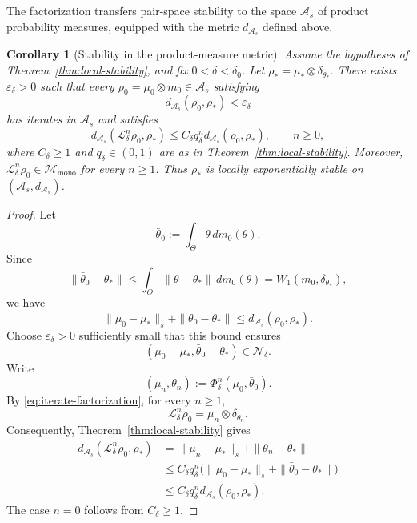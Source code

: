 \documentclass[11pt]{article}
\newtheorem{corollary}[theorem]{Corollary}
\theoremstyle{definition}
\theoremstyle{remark}
\newcommand{\STO}{\mathcal{L}}
\newcommand{\Mmono}{\mathscr{M}_{\mathrm{mono}}}
\begin{document}
{

The factorization transfers pair-space stability to the
space $\mathcal A_s$ of product probability measures,
equipped with the metric $d_{\mathcal A_s}$ defined above.

\begin{corollary}[Stability in the product-measure metric]
\label{cor:ambient-metric-stability}
Assume the hypotheses of
Theorem~\ref{thm:local-stability}, and fix
$0<\delta<\delta_0$.
Let $\rho_*=\mu_*\otimes\delta_{\theta_*}$.
There exists $\varepsilon_\delta>0$ such that every
$\rho_0=\mu_0\otimes m_0\in\mathcal A_s$ satisfying
\[
  d_{\mathcal A_s}(\rho_0,\rho_*)<\varepsilon_\delta
\]
has iterates in $\mathcal A_s$ and satisfies
\begin{equation}
  d_{\mathcal A_s}(\STO_\delta^n\rho_0,\rho_*)
  \leq
  C_\delta q_\delta^n
  d_{\mathcal A_s}(\rho_0,\rho_*),
  \qquad n\geq0,
  \label{eq:ambient-metric-contraction}
\end{equation}
where $C_\delta\geq1$ and $q_\delta\in(0,1)$ are as in
Theorem~\ref{thm:local-stability}.
Moreover, $\STO_\delta^n\rho_0\in\Mmono$ for every $n\geq1$.
Thus $\rho_*$ is locally exponentially stable on
$(\mathcal A_s,d_{\mathcal A_s})$.
\end{corollary}

\begin{proof}
Let
\[
  \bar\theta_0:=\int_\Theta\theta\,dm_0(\theta).
\]
Since
\[
  \|\bar\theta_0-\theta_*\|
  \leq
  \int_\Theta\|\theta-\theta_*\|\,dm_0(\theta)
  =W_1(m_0,\delta_{\theta_*}),
\]
we have
\[
  \|\mu_0-\mu_*\|_s+\|\bar\theta_0-\theta_*\|
  \leq d_{\mathcal A_s}(\rho_0,\rho_*).
\]
Choose $\varepsilon_\delta>0$ sufficiently small that
this bound ensures
\[
  (\mu_0-\mu_*,\bar\theta_0-\theta_*)\in\mathcal N_\delta.
\]
Write
\[
  (\mu_n,\theta_n)
  :=\Phi_\delta^n(\mu_0,\bar\theta_0).
\]
By \eqref{eq:iterate-factorization}, for every $n\geq1$,
\[
  \STO_\delta^n\rho_0=\mu_n\otimes\delta_{\theta_n}.
\]
Consequently, Theorem~\ref{thm:local-stability} gives
\[
\begin{aligned}
  d_{\mathcal A_s}(\STO_\delta^n\rho_0,\rho_*)
  &=\|\mu_n-\mu_*\|_s+\|\theta_n-\theta_*\|\\
  &\leq
  C_\delta q_\delta^n
  \bigl(\|\mu_0-\mu_*\|_s+\|\bar\theta_0-\theta_*\|\bigr)\\
  &\leq
  C_\delta q_\delta^n d_{\mathcal A_s}(\rho_0,\rho_*).
\end{aligned}
\]
The case $n=0$ follows from $C_\delta\geq1$.
\end{proof}




}
\end{document}
